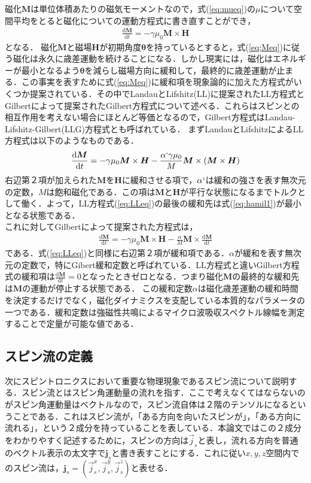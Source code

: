 磁化$\bm{M}$は単位体積あたりの磁気モーメントなので，式(\ref{eq:mueq})の$\mu$について空間平均をとると磁化についての運動方程式に書き直すことができ，
\begin{eqnarray}
\frac{\mathrm{d}\bm{M}}{\mathrm{d}t}=-\gamma\mu_{0}\bm{M}\times\bm{H}
\label{eq:Meq}
\end{eqnarray}
となる．
磁化$\bm{M}$と磁場$\bm{H}$が初期角度$\bm{\theta}$を持っているとすると，式(\ref{eq;Meq})に従う磁化は永久に歳差運動を続けることになる．しかし現実には，磁化はエネルギーが最小となるよう$\bm{\theta}$を減らし磁場方向に緩和して，最終的に歳差運動が止まる．この事実を表すために式(\ref{eq:Meq})に緩和項を現象論的に加えた方程式がいくつか提案されている．その中でLandauとLifshitz(LL)に提案されたLL方程式とGilbertによって提案されたGilbert方程式について述べる．これらはスピンとの相互作用を考えない場合にほとんど等価となるので，Gilbert方程式はLandau-Lifshitz-Gilbert(LLG)方程式とも呼ばれている．
まずLandauとLifshitzによるLL方程式は以下のようなものである．
\begin{eqnarray}
\frac{\mathrm{d}\bm{M}}{\mathrm{d}t}=-\gamma\mu_{0}\bm{M}\times\bm{H}-\frac{\alpha`\gamma\mu_{0}}{M}\bm{M}\times(\bm{M}\times\bm{H})
\label{eq:LLeq}
\end{eqnarray}
右辺第２項が加えられた$\bm{M}$を$\bm{H}$に緩和させる項で，$\alpha`$は緩和の強さを表す無次元の定数，$M$は飽和磁化である．この項は$\bm{M}$と$\bm{H}$が平行な状態になるまでトルクとして働く．よって，LL方程式(\ref{eq:LLeq})の最後の緩和先は式(\ref{eq:hamil1})が最小となる状態である．\\
これに対してGilbertによって提案された方程式は，
\begin{eqnarray}
\frac{\mathrm{d}\bm{M}}{\mathrm{d}t}=-\gamma\mu_{0}\bm{M}\times\bm{H}-\frac{\alpha}{M}\bm{M}\times\frac{\mathrm{d}\bm{M}}{\mathrm{d}t}
\label{eq:LLGeq}
\end{eqnarray}
である．式(\ref{eq:LLeq})と同様に右辺第２項が緩和項である．$\alpha$が緩和を表す無次元の定数で，特にGibert緩和定数と呼ばれている．LL方程式と違いGilbert方程式の緩和項は$\frac{\mathrm{d}\bm{M}}{\mathrm{d}t}=0$となったときゼロとなる．つまり磁化$\bm{M}$の最終的な緩和先は$\bm{M}$の運動が停止する状態である．
この緩和定数$\alpha$は磁化歳差運動の緩和時間を決定するだけでなく，磁化ダイナミクスを支配している本質的なパラメータの一つである．緩和定数は強磁性共鳴によるマイクロ波吸収スペクトル線幅を測定することで定量が可能な値である．

\subsection{スピン流の定義}
次にスピントロニクスにおいて重要な物理現象であるスピン流について説明する．スピン流とはスピン角運動量の流れを指す．ここで考えなくてはならないのがスピン角運動量はベクトルなので，スピン流自体は２階のテンソルになるということである．これはスピン流が，「ある方向を向いたスピンが」，「ある方向に流れる」，という２成分を持っていることを表している．本論文ではこの２成分をわかりやすく記述するために，スピンの方向は$\vec{j}_{s}$と表し，流れる方向を普通のベクトル表示の太文字で$\bm{j}_{s}$と書き表すことにする．これに従い$x,y,z$空間内でのスピン流は，$\bm{j}_{s}=(\vec{j}_{s}^{x},\vec{j}_{s}^{y},\vec{j}_{s}^{z})$と表せる．

